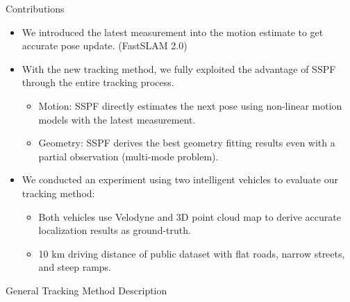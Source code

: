 \documentclass[final,hyperref={pdfpagelabels=false}]{beamer}
\begin{document}
\begin{frame}[t]
\begin{columns}[t]
\begin{column}{0.47\textwidth}
\begin{block}{Contributions}
\begin{itemize}
	\item We introduced the latest measurement into the motion estimate to get accurate pose update. (FastSLAM 2.0)
	\item With the new tracking method, we fully exploited the advantage of SSPF through the entire tracking process.
	\begin{itemize}
		\item Motion: SSPF directly estimates the next pose using non-linear motion models with the latest measurement.
		\item Geometry: SSPF derives the best geometry fitting results even with a partial observation (multi-mode problem).
	\end{itemize}
	\item We conducted an experiment using two intelligent vehicles to evaluate our tracking method:
	\begin{itemize}
		\item Both vehicles use Velodyne and 3D point cloud map to derive accurate localization results as ground-truth.
		\item 10 km driving distance of public dataset with flat roads, narrow streets, and steep ramps.
	\end{itemize}
\end{itemize}

\end{block}


\begin{block}{General Tracking Method Description}


\end{block}
\end{column}
\end{columns}
\end{frame}
\end{document}

